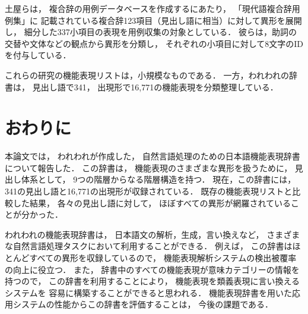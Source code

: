\documentclass[japanese]{jnlp_1.3e}
\begin{document}
土屋らは，
複合辞の用例データベースを作成するにあたり，
「現代語複合辞用例集」に
記載されている複合辞123項目（見出し語に相当）に対して異形を展開し，
細分した337小項目の表現を用例収集の対象としている．
彼らは，助詞の交替や文体などの観点から異形を分類し，
それぞれの小項目に対して8文字のIDを付与している．

これらの研究の機能表現リストは，小規模なものである．
一方，われわれの辞書は，
見出し語で341，
出現形で16,771の機能表現を分類整理している．




\section{おわりに}

本論文では，
われわれが作成した，
自然言語処理のための日本語機能表現辞書について報告した．
この辞書は，
機能表現のさまざまな異形を扱うために，
見出し体系として，
9つの階層からなる階層構造を持つ．
現在，この辞書には，
341の見出し語と16,771の出現形が収録されている．
既存の機能表現リストと比較した結果，
各々の見出し語に対して，
ほぼすべての異形が網羅されていることが分かった．

われわれの機能表現辞書は，
日本語文の解析，生成，言い換えなど，
さまざまな自然言語処理タスクにおいて利用することができる．
例えば，
この辞書はほとんどすべての異形を収録しているので，
機能表現解析システムの検出被覆率の向上に役立つ．
また，
辞書中のすべての機能表現が意味カテゴリーの情報を持つので，
この辞書を利用することにより，
機能表現を類義表現に言い換えるシステムを
容易に構築することができると思われる．
機能表現辞書を用いた応用システムの性能からこの辞書を評価することは，
今後の課題である．
\end{document}
